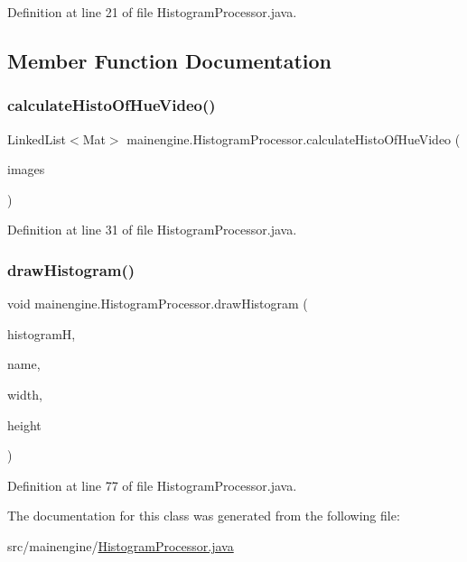 Definition at line 21 of file Histogram\+Processor.\+java.



\subsection{Member Function Documentation}
\hypertarget{classmainengine_1_1_histogram_processor_a5bd85446efa3f4d33a6dd02e34bafce6}{}\label{classmainengine_1_1_histogram_processor_a5bd85446efa3f4d33a6dd02e34bafce6} 
\subsubsection{\texorpdfstring{calculate\+Histo\+Of\+Hue\+Video()}{calculateHistoOfHueVideo()}}
{\footnotesize\ttfamily Linked\+List$<$Mat$>$ mainengine.\+Histogram\+Processor.\+calculate\+Histo\+Of\+Hue\+Video (\begin{DoxyParamCaption}\item[{Linked\+List$<$ Mat $>$}]{images }\end{DoxyParamCaption})}



Definition at line 31 of file Histogram\+Processor.\+java.

\hypertarget{classmainengine_1_1_histogram_processor_adff19084e721e59757acca5b259f8161}{}\label{classmainengine_1_1_histogram_processor_adff19084e721e59757acca5b259f8161} 
\subsubsection{\texorpdfstring{draw\+Histogram()}{drawHistogram()}}
{\footnotesize\ttfamily void mainengine.\+Histogram\+Processor.\+draw\+Histogram (\begin{DoxyParamCaption}\item[{Mat}]{histogramH,  }\item[{String}]{name,  }\item[{int}]{width,  }\item[{int}]{height }\end{DoxyParamCaption})}



Definition at line 77 of file Histogram\+Processor.\+java.



The documentation for this class was generated from the following file\+:\begin{DoxyCompactItemize}
\item 
src/mainengine/\hyperlink{_histogram_processor_8java}{Histogram\+Processor.\+java}\end{DoxyCompactItemize}
